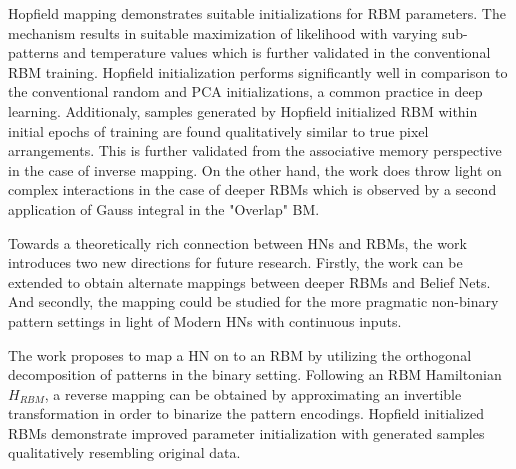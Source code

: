 \documentclass[11pt,letterpaper]{article}
\begin{document}
Hopfield mapping demonstrates suitable initializations for RBM parameters. The mechanism results in suitable maximization of likelihood with varying sub-patterns and temperature values which is further validated in the conventional RBM training. Hopfield initialization performs significantly well in comparison to the conventional random and PCA initializations, a common practice in deep learning. Additionaly, samples generated by Hopfield initialized RBM within initial epochs of training are found qualitatively similar to true pixel arrangements. This is further validated from the associative memory perspective in the case of inverse mapping. On the other hand, the work does throw light on complex interactions in the case of deeper RBMs which is observed by a second application of Gauss integral in the "Overlap" BM. 

Towards a theoretically rich connection between HNs and RBMs, the work introduces two new directions for future research. Firstly, the work can be extended to obtain alternate mappings between deeper RBMs and Belief Nets. And secondly, the mapping could be studied for the more pragmatic non-binary pattern settings in light of Modern HNs with continuous inputs.

The work proposes to map a HN on to an RBM by utilizing the orthogonal decomposition of patterns in the binary setting. Following an RBM Hamiltonian $H_{RBM}$, a reverse mapping can be obtained by approximating an invertible transformation in order to binarize the pattern encodings. Hopfield initialized RBMs demonstrate improved parameter initialization with generated samples qualitatively resembling original data. 
\end{document}
